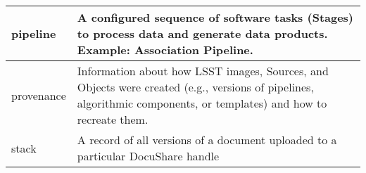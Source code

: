 \begin{longtable}{|l|p{}|}
pipeline & A configured sequence of software tasks (Stages) to process data and generate data products. Example: Association Pipeline. \\\hline
provenance & Information about how LSST images, Sources, and Objects were created (e.g., versions of pipelines, algorithmic components, or templates) and how to recreate them. \\\hline
stack & A record of all versions of a document uploaded to a particular DocuShare handle \\\hline
\end{longtable}
